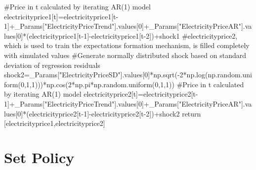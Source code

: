 \documentclass[
  letterpaper,
  DIV=11,
  numbers=noendperiod]{scrartcl}
\newenvironment{Shaded}{\begin{snugshade}}{\end{snugshade}}
\newcommand{\CommentTok}[1]{\textcolor[rgb]{0.37,0.37,0.37}{#1}}
\newcommand{\ControlFlowTok}[1]{\textcolor[rgb]{0.00,0.23,0.31}{#1}}
\newcommand{\DecValTok}[1]{\textcolor[rgb]{0.68,0.00,0.00}{#1}}
\newcommand{\NormalTok}[1]{\textcolor[rgb]{0.00,0.23,0.31}{#1}}
\newcommand{\OperatorTok}[1]{\textcolor[rgb]{0.37,0.37,0.37}{#1}}
\newcommand{\StringTok}[1]{\textcolor[rgb]{0.13,0.47,0.30}{#1}}
\begin{document}
\begin{Shaded}
\begin{Highlighting}[]
            \CommentTok{\#Price in t calculated by iterating AR(1) model}
\NormalTok{            electricityprice1[t]}\OperatorTok{=}\NormalTok{electricityprice1[t}\OperatorTok{{-}}\DecValTok{1}\NormalTok{]}\OperatorTok{+}\NormalTok{\_Params[}\StringTok{"ElectricityPriceTrend"}\NormalTok{].values[}\DecValTok{0}\NormalTok{]}\OperatorTok{+}\NormalTok{\_Params[}\StringTok{"ElectricityPriceAR"}\NormalTok{].values[}\DecValTok{0}\NormalTok{]}\OperatorTok{*}\NormalTok{(electricityprice1[t}\OperatorTok{{-}}\DecValTok{1}\NormalTok{]}\OperatorTok{{-}}\NormalTok{electricityprice1[t}\OperatorTok{{-}}\DecValTok{2}\NormalTok{])}\OperatorTok{+}\NormalTok{shock1 }
        \CommentTok{\#electricityprice2, which is used to train the expectations formation mechanism, is filled completely with simulated values}
        \CommentTok{\#Generate normally distributed shock based on standard deviation of regression residuals}
\NormalTok{        shock2}\OperatorTok{=}\NormalTok{\_Params[}\StringTok{"ElectricityPriceSD"}\NormalTok{].values[}\DecValTok{0}\NormalTok{]}\OperatorTok{*}\NormalTok{np.sqrt(}\OperatorTok{{-}}\DecValTok{2}\OperatorTok{*}\NormalTok{np.log(np.random.uniform(}\DecValTok{0}\NormalTok{,}\DecValTok{1}\NormalTok{,}\DecValTok{1}\NormalTok{)))}\OperatorTok{*}\NormalTok{np.cos(}\DecValTok{2}\OperatorTok{*}\NormalTok{np.pi}\OperatorTok{*}\NormalTok{np.random.uniform(}\DecValTok{0}\NormalTok{,}\DecValTok{1}\NormalTok{,}\DecValTok{1}\NormalTok{))}
        \CommentTok{\#Price in t calculated by iterating AR(1) model}
\NormalTok{        electricityprice2[t]}\OperatorTok{=}\NormalTok{electricityprice2[t}\OperatorTok{{-}}\DecValTok{1}\NormalTok{]}\OperatorTok{+}\NormalTok{\_Params[}\StringTok{"ElectricityPriceTrend"}\NormalTok{].values[}\DecValTok{0}\NormalTok{]}\OperatorTok{+}\NormalTok{\_Params[}\StringTok{"ElectricityPriceAR"}\NormalTok{].values[}\DecValTok{0}\NormalTok{]}\OperatorTok{*}\NormalTok{(electricityprice2[t}\OperatorTok{{-}}\DecValTok{1}\NormalTok{]}\OperatorTok{{-}}\NormalTok{electricityprice2[t}\OperatorTok{{-}}\DecValTok{2}\NormalTok{])}\OperatorTok{+}\NormalTok{shock2}
    \ControlFlowTok{return}\NormalTok{ [electricityprice1,electricityprice2]}
\end{Highlighting}
\end{Shaded}

\hypertarget{set-policy}{%
\section{Set Policy}\label{set-policy}}
\end{document}
